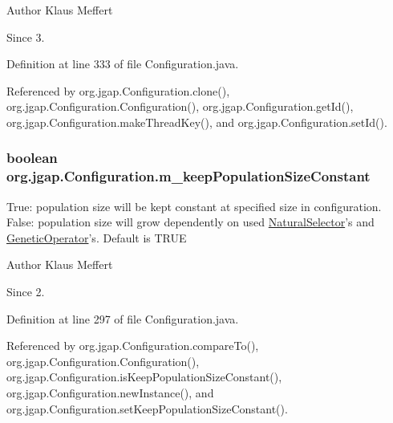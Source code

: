 \begin{DoxyAuthor}{Author}
Klaus Meffert 
\end{DoxyAuthor}
\begin{DoxySince}{Since}
3. 
\end{DoxySince}


Definition at line 333 of file Configuration.\-java.



Referenced by org.\-jgap.\-Configuration.\-clone(), org.\-jgap.\-Configuration.\-Configuration(), org.\-jgap.\-Configuration.\-get\-Id(), org.\-jgap.\-Configuration.\-make\-Thread\-Key(), and org.\-jgap.\-Configuration.\-set\-Id().

\hypertarget{classorg_1_1jgap_1_1_configuration_a9af68cb4e7f1b5626cf053862ec1004a}{
\subsubsection[{m\-\_\-keep\-Population\-Size\-Constant}]{\setlength{\rightskip}{0pt plus 5cm}boolean org.\-jgap.\-Configuration.\-m\-\_\-keep\-Population\-Size\-Constant\hspace{0.3cm}{\ttfamily [private]}}}\label{classorg_1_1jgap_1_1_configuration_a9af68cb4e7f1b5626cf053862ec1004a}
True\-: population size will be kept constant at specified size in configuration. False\-: population size will grow dependently on used \hyperlink{classorg_1_1jgap_1_1_natural_selector}{Natural\-Selector}'s and \hyperlink{interfaceorg_1_1jgap_1_1_genetic_operator}{Genetic\-Operator}'s. Default is T\-R\-U\-E

\begin{DoxyAuthor}{Author}
Klaus Meffert 
\end{DoxyAuthor}
\begin{DoxySince}{Since}
2. 
\end{DoxySince}


Definition at line 297 of file Configuration.\-java.



Referenced by org.\-jgap.\-Configuration.\-compare\-To(), org.\-jgap.\-Configuration.\-Configuration(), org.\-jgap.\-Configuration.\-is\-Keep\-Population\-Size\-Constant(), org.\-jgap.\-Configuration.\-new\-Instance(), and org.\-jgap.\-Configuration.\-set\-Keep\-Population\-Size\-Constant().

